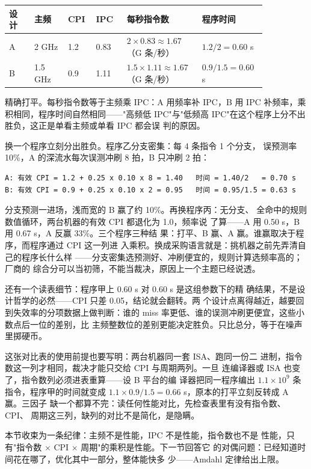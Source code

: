 \begin{longtable}{L{0.09\linewidth}L{0.12\linewidth}L{0.1\linewidth}L{0.11\linewidth}L{0.24\linewidth}L{0.19\linewidth}}
\toprule
设计 & 主频 & CPI & IPC & 每秒指令数 & 程序时间 \\
\midrule
A & 2 GHz & 1.2 & 0.83 & $2\times0.83\approx1.67$（G 条/秒） & $1.2/2=0.60$ s \\
B & 1.5 GHz & 0.9 & 1.11 & $1.5\times1.11\approx1.67$（G 条/秒） & $0.9/1.5=0.60$ s \\
\bottomrule
\end{longtable}

精确打平。每秒指令数等于主频乘 IPC：A 用频率补 IPC，B 用 IPC
补频率，乘积相同，程序时间自然相同——"高频低 IPC"与"低频高
IPC"在这个程序上分不出胜负，这正是单看主频或单看 IPC 都会误
判的原因。

换一个程序立刻分出胜负。程序乙分支密集：每 4 条指令 1 个分支，
误预测率 10\%，A 的深流水每次误测冲刷 8 拍，B 只冲刷 2 拍：

\begin{lstlisting}
A: 有效 CPI = 1.2 + 0.25 x 0.10 x 8 = 1.40   时间 = 1.40/2   = 0.70 s
B: 有效 CPI = 0.9 + 0.25 x 0.10 x 2 = 0.95   时间 = 0.95/1.5 = 0.63 s
\end{lstlisting}

分支预测一进场，浅而宽的 B 赢了约 10\%。再换程序丙：无分支、
全命中的规则数值循环，两台机器的有效 CPI 都退化为 1.0，频率说
了算——A 用 0.50 s，B 用 0.67 s，A 反赢 33\%。三个程序三种结
果：打平、B 赢、A 赢。谁赢取决于程序，而程序通过 CPI 这一列进
入乘积。换成采购语言就是：挑机器之前先弄清自己的程序长什么样
——分支密集选预测好、冲刷便宜的，规则计算选频率高的；厂商的
综合分可以当初筛，不能当裁决，原因上一个主题已经说透。

还有一个读表细节：程序甲上 0.60 s 对 0.60 s 是这组参数下的精
确结果，不是设计哲学的必然——CPI 只差 0.05，结论就会翻转。两
个设计点离得越近，越要回到失效率的分项数据上做判断：谁的
miss 率更低、谁的误测冲刷更便宜，这些小数点后一位的差别，比
主频整数位的差别更能决定胜负。只比总分，等于在噪声里掷硬币。

这张对比表的使用前提也要写明：两台机器同一套 ISA、跑同一份二
进制，指令数这一列才相同，裁决才能只交给 CPI 与周期两列。一旦
连编译器或 ISA 也变了，指令数列必须进表重算——设 B 平台的编
译器把同一程序编出 $1.1\times10^9$ 条指令，程序甲的时间就变成
$1.1\times0.9/1.5=0.66$ s，原本的打平立刻反转成 A 赢。三因子
缺一个都算不完：读任何性能对比，先检查表里有没有指令数、CPI、
周期这三列，缺列的对比不是简化，是隐瞒。

本节收束为一条纪律：主频不是性能，IPC 不是性能，指令数也不是
性能，只有"指令数 × CPI × 周期"的乘积是性能。下一节回答它
的对偶问题：已经知道时间花在哪了，优化其中一部分，整体能快多
少——Amdahl 定律给出上限。


